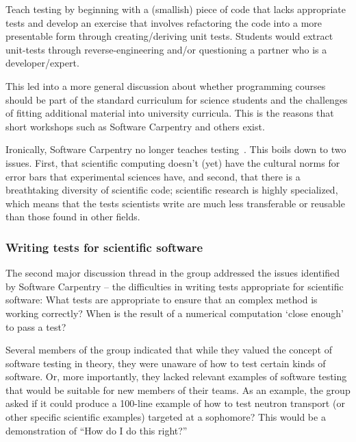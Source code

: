 \documentclass[11pt, oneside]{amsart}
\begin{document}
Teach testing by beginning with a (smallish) piece of code that lacks
appropriate tests and develop an exercise that involves refactoring the code
into a more presentable form through creating/deriving unit tests. Students
would extract unit-tests through reverse-engineering and/or questioning a
partner who is a developer/expert.

This led into a more general discussion about whether programming courses
should be part of the standard curriculum for science students and the
challenges of fitting additional material into university curricula. This is the
reasons that short workshops such as Software Carpentry and others exist.

Ironically, Software Carpentry no longer teaches testing~\cite{SCtesting}. This
boils down to two issues. First, that scientific computing doesn't (yet) have
the cultural norms for error bars that experimental sciences have, and second,
that there is a breathtaking diversity of scientific code; scientific research
is highly specialized, which means that the tests scientists write are much less
transferable or reusable than those found in other fields.

\subsubsection{Writing tests for scientific software}
The second major discussion thread in the group addressed the issues identified
by Software Carpentry -- the difficulties in writing tests appropriate for
scientific software: %
What tests are
appropriate to ensure that an complex method is working correctly? When is the
result of a numerical computation `close enough' to pass a test?
 
Several members of the group indicated that while they valued the concept of
software testing in theory, they were unaware of how to test certain kinds of
software. Or, more importantly, they lacked relevant examples of software
testing that would be suitable for new members of their teams. As an example, the
group asked if it could produce a 100-line example of how to test neutron
transport (or other specific scientific examples) targeted at a sophomore? This
would be a demonstration of ``How do I do this right?''
\end{document}
